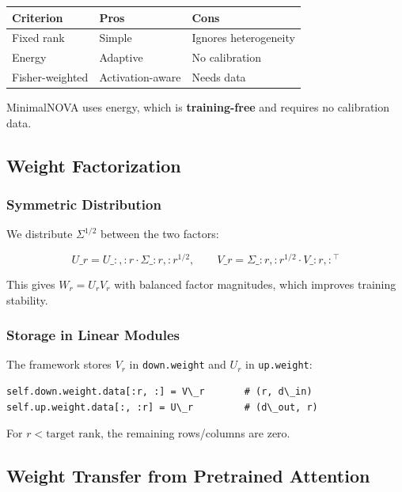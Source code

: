 \begin{table}[H]
\centering
\small
\begin{tabular}{lll}
\toprule
\textbf{Criterion} & \textbf{Pros} & \textbf{Cons} \\
\midrule
Fixed rank & Simple & Ignores heterogeneity \\
Energy & Adaptive & No calibration \\
Fisher-weighted & Activation-aware & Needs data \\
\bottomrule
\end{tabular}
\end{table}

MinimalNOVA uses energy, which is \textbf{training-free} and requires no 
calibration data.

\subsection{Weight Factorization}

\subsubsection{Symmetric Distribution}

We distribute $\Sigma^{1/2}$ between the two factors:

\[
U\_r = U\_{:, :r} \cdot \Sigma\_{:r, :r}^{1/2}, \qquad
V\_r = \Sigma\_{:r, :r}^{1/2} \cdot V\_{:r, :}^\top
\tag{4.5}
\]

This gives $W_r = U_r V_r$ with balanced factor magnitudes, which improves 
training stability.

\subsubsection{Storage in Linear Modules}

The framework stores $V_r$ in \texttt{down.weight} and $U_r$ in \texttt{up.weight}:

\begin{lstlisting}
self.down.weight.data[:r, :] = V\_r       # (r, d\_in)
self.up.weight.data[:, :r] = U\_r         # (d\_out, r)
\end{lstlisting}

For $r < \text{target rank}$, the remaining rows/columns are zero.

\subsection{Weight Transfer from Pretrained Attention}

